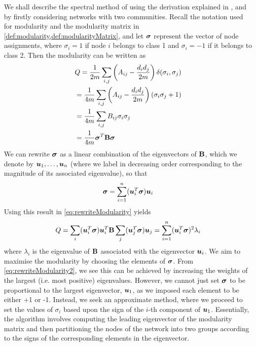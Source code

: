 We shall describe the spectral method of \cite{New06a} using the derivation explained in \cite{New06a,New06b,For10}, and by firstly considering networks with two communities.
Recall the notation used for modularity and the modularity matrix in \cref{def:modularity,def:modularityMatrix}, and let $\vecvar{\sigma}$ represent the vector of node assignments, where $\sigma_{i} = 1$ if node $i$ belongs to class 1 and $\sigma_{i} = -1$ if it belongs to class 2.
Then the modularity can be written as
\begin{equation}
	\label{eq:rewriteModularity}
	\begin{split}
		&Q = \frac{1}{2m} \sum_{i,j} \left(A_{ij} - \frac{d_{i}d_{j}}{2m} \right) \delta(\sigma_{i},\sigma_{j}) \\
		&= \frac{1}{4m} \sum_{i,j} \left(A_{ij} - \frac{d_{i}d_{j}}{2m} \right) (\sigma_{i}\sigma_{j} + 1) \\
		&= \frac{1}{4m} \sum_{i,j} B_{ij} \sigma_{i} \sigma_{j} \\
		&= \frac{1}{4m} \transpose{\vecvar{\sigma}} \matvar{B} \vecvar{\sigma}
	\end{split}
\end{equation}
We can rewrite $\vecvar{\sigma}$ as a linear combination of the eigenvectors of $\mathbf B$, which we denote by $\vecvar{u}_{1},\dots,\vecvar{u}_{n}$ (where we label in decreasing order corresponding to the magnitude of its associated eigenvalue), so that
\begin{equation}
	\label{eq:rewriteNodeAssignments}
	\vecvar{\sigma} = \sum_{i=1}^{n} (\transpose{\vecvar{u}_{i}} \vecvar{\sigma}) \vecvar{u}_{i}
\end{equation}
Using this result in \cref{eq:rewriteModularity} yields
\begin{equation}
	\label{eq:rewriteModularity2}
	Q = \sum_{i} (\transpose{\vecvar{u}_{i}} \vecvar{\sigma}) \transpose{\vecvar{u}_{i}} \matvar{B} \sum_{j} (\transpose{\vecvar{u}_{j}} \vecvar{\sigma}) \vecvar{u}_{j} = \sum_{i=1}^{n} (\transpose{\vecvar{u}_{i}} \vecvar{\sigma})^{2} \lambda_{i}
\end{equation}
where $\lambda_{i}$ is the eigenvalue of $\mathbf B$ associated with the eigenvector $\vecvar{u}_{i}$.
We aim to maximise the modularity by choosing the elements of $\vecvar{\sigma}$. From \cref{eq:rewriteModularity2}, we see this can be achieved by increasing the weights of the largest (i.e. most positive) eigenvalues.
However, we cannot just set $\vecvar{\sigma}$ to be proportional to the largest eigenvector, $\vecvar{u}_{1}$, as we imposed each element to be either +1 or -1.
Instead, we seek an approximate method, where we proceed to set the values of $\sigma_{i}$ based upon the sign of the $i$-th component of $\vecvar{u}_{1}$.
Essentially, the algorithm involves computing the leading eigenvector of the modularity matrix and then partitioning the nodes of the network into two groups according to the signs of the corresponding elements in the eigenvector.

